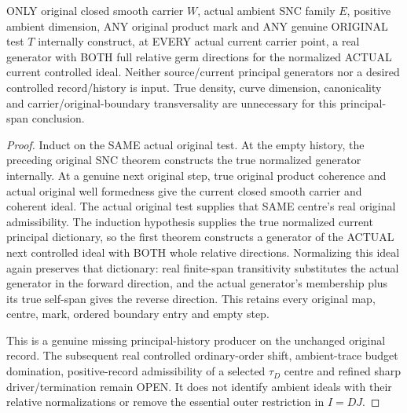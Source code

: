 \begin{theorem}
\label{hir:sharp-original-product-any-test-normalized-principal-history}
\leanok
ONLY original closed smooth carrier $W$, actual ambient SNC family $E$,
positive ambient dimension, ANY original product mark and ANY genuine
ORIGINAL test $T$ internally construct, at EVERY actual current carrier
point, a real generator with BOTH full relative germ directions for
the normalized ACTUAL current controlled ideal. Neither source/current
principal generators nor a desired controlled record/history is input.
True density, curve dimension, canonicality and carrier/original-boundary
transversality are unnecessary for this principal-span conclusion.
\end{theorem}
\begin{proof}
Induct on the SAME actual original test. At the empty history, the preceding
original SNC theorem constructs the true normalized generator internally.
At a genuine next original step, true original product coherence and
actual original well formedness give the current closed smooth carrier
and coherent ideal. The actual original test supplies that SAME centre's
real original admissibility. The induction hypothesis supplies the true
normalized current principal dictionary, so the first theorem constructs
a generator of the ACTUAL next controlled ideal with BOTH whole relative
directions. Normalizing this ideal again preserves that dictionary:
real finite-span transitivity substitutes the actual generator in the
forward direction, and the actual generator's membership plus its true
self-span gives the reverse direction. This retains every original map,
centre, mark, ordered boundary entry and empty step.

This is a genuine missing principal-history producer on the unchanged
original record. The subsequent real controlled ordinary-order shift,
ambient-trace budget domination, positive-record admissibility of a
selected $\tau_D$ centre and refined sharp driver/termination remain OPEN.
It does not identify ambient ideals with their relative normalizations
or remove the essential outer restriction in $I=D J$.
\end{proof}
